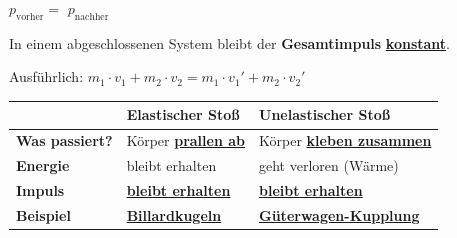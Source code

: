 \documentclass[11pt,a4paper]{article}
\newcommand{\lsg}[1]{\textcolor{loesung}{\underline{\textbf{#1}}}}
\begin{document}
\begin{kasten}[K5: Impulserhaltungssatz]

\begin{center}
\begin{formelbox}
\vspace{5pt}
{\Large $p_{\text{vorher}} = $ \lsg{$p_{\text{nachher}}$}}

\vspace{10pt}

{\normalsize In einem abgeschlossenen System bleibt der \textbf{Gesamtimpuls} \lsg{konstant}.}
\vspace{5pt}
\end{formelbox}
\end{center}

\vspace{3pt}

Ausführlich: $m_1 \cdot v_1 + m_2 \cdot v_2 = m_1 \cdot v_1' + m_2 \cdot v_2'$

\end{kasten}

\vspace{5mm}


\begin{kasten}

\vspace{3pt}

\begin{tabular}{|p{4cm}|p{5cm}|p{5cm}|}
\hline
& \textbf{Elastischer Stoß} & \textbf{Unelastischer Stoß} \\
\hline
\textbf{Was passiert?} & Körper \lsg{prallen ab} & Körper \lsg{kleben zusammen} \\[0.8em]
\hline
\textbf{Energie} & bleibt erhalten & geht verloren (Wärme) \\[0.8em]
\hline
\textbf{Impuls} & \lsg{bleibt erhalten} & \lsg{bleibt erhalten} \\[0.8em]
\hline
\textbf{Beispiel} & \lsg{Billardkugeln} & \lsg{Güterwagen-Kupplung} \\[0.8em]
\hline
\end{tabular}

\end{kasten}

\newpage

\end{document}
